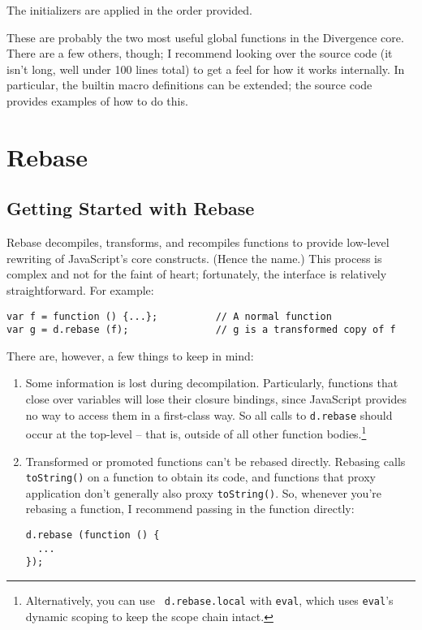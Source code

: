 \documentclass{report}
\begin{document}
    The initializers are applied in the order provided.

    These are probably the two most useful global functions in the Divergence core. There are a few others, though; I recommend looking over the source code (it isn't long, well under 100
    lines total) to get a feel for how it works internally. In particular, the builtin macro definitions can be extended; the source code provides examples of how to do this.

\part {Rebase}
\chapter {Getting Started with Rebase}
    Rebase decompiles, transforms, and recompiles functions to provide low-level rewriting of JavaScript's core constructs. (Hence the name.) This process is complex and not for the faint of
    heart; fortunately, the interface is relatively straightforward. For example:

\begin{verbatim}
var f = function () {...};          // A normal function
var g = d.rebase (f);               // g is a transformed copy of f
\end{verbatim}

    There are, however, a few things to keep in mind:

\begin{enumerate}
\item Some information is lost during decompilation. Particularly, functions that close over variables will lose their closure bindings, since JavaScript provides no way to access them in a
        first-class way. So all calls to \verb|d.rebase| should occur at the top-level -- that is, outside of all other function bodies.\footnote{Alternatively, you can use {\tt
        d.rebase.local} with {\tt eval}, which uses {\tt eval}'s dynamic scoping to keep the scope chain intact.}

\item Transformed or promoted functions can't be rebased directly. Rebasing calls \verb|toString()| on a function to obtain its code, and functions that proxy application don't generally
        also proxy \verb|toString()|. So, whenever you're rebasing a function, I recommend passing in the function directly:

\begin{verbatim}
d.rebase (function () {
  ...
});
\end{verbatim}
\end{enumerate}
\end{document}

